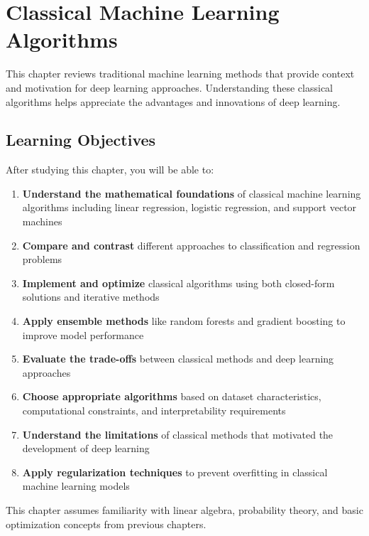 
\chapter{Classical Machine Learning Algorithms}
\label{chap:classical-ml}

This chapter reviews traditional machine learning methods that provide context and motivation for deep learning approaches. Understanding these classical algorithms helps appreciate the advantages and innovations of deep learning.

\section*{Learning Objectives}

After studying this chapter, you will be able to:

\begin{enumerate}
    \item \textbf{Understand the mathematical foundations} of classical machine learning algorithms including linear regression, logistic regression, and support vector machines
    \item \textbf{Compare and contrast} different approaches to classification and regression problems
    \item \textbf{Implement and optimize} classical algorithms using both closed-form solutions and iterative methods
    \item \textbf{Apply ensemble methods} like random forests and gradient boosting to improve model performance
    \item \textbf{Evaluate the trade-offs} between classical methods and deep learning approaches
    \item \textbf{Choose appropriate algorithms} based on dataset characteristics, computational constraints, and interpretability requirements
    \item \textbf{Understand the limitations} of classical methods that motivated the development of deep learning
    \item \textbf{Apply regularization techniques} to prevent overfitting in classical machine learning models
\end{enumerate}

 This chapter assumes familiarity with linear algebra, probability theory, and basic optimization concepts from previous chapters.











